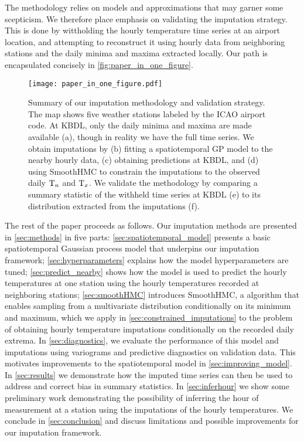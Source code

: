 The methodology relies on models and approximations that may garner some scepticism.
We therefore place emphasis on validating the imputation strategy.
This is done by wittholding the hourly temperature time series at an airport location,
and attempting to reconstruct it using hourly data from neighboring stations 
and the daily minima and maxima extracted locally.
Our path is encapsulated concisely in \autoref{fig:paper_in_one_figure}.

\begin{figure}[tb]
\centering
\texttt{[image: paper\_in\_one\_figure.pdf]}
\caption{\label{fig:paper_in_one_figure}
Summary of our imputation methodology and validation strategy.
The map shows five weather stations labeled by the ICAO airport code.
At KBDL, only the daily minima and maxima are made available (a), though in reality
we have the full time series.
We obtain imputations by (b) fitting a spatiotemporal GP model to the nearby hourly data,
(c) obtaining predictions at KBDL, and (d) using SmoothHMC to constrain the imputations to the observed daily $\mathrm{T}_{n}$ and $\mathrm{T}_{x}$.
We validate the methodology by comparing a summary statistic of the withheld time series at KBDL (e) to
its distribution extracted from the imputations (f).
}
\end{figure}

The rest of the paper proceeds as follows.
Our imputation methods are presented in \autoref{sec:methods} in five parts:
\autoref{sec:spatiotemporal_model} presents a basic spatiotemporal Gaussian process model 
that underpins our imputation framework;
\autoref{sec:hyperparameters} explains how the model hyperparameters are tuned;
\autoref{sec:predict_nearby} shows how the model is used to predict the hourly temperatures 
at one station using the hourly temperatures recorded at neighboring stations;
\autoref{sec:smoothHMC} introduces SmoothHMC, a algorithm that enables
sampling from a multivariate distribution conditionally on its minimum and maximum,
which we apply in \autoref{sec:constrained_imputations} to the problem
of obtaining hourly temperature imputations conditionally on the recorded daily extrema.
In \autoref{sec:diagnostics}, we evaluate the performance of this model and imputations
using variograms and predictive diagnostics on validation data.
This motivates improvements to the spatiotemporal model in \autoref{sec:improving_model}.
In \autoref{sec:results} we demonstrate how the imputed time series can then be used 
to address and correct bias in summary statistics.
In \autoref{sec:inferhour} we show some preliminary work demonstrating the possibility of inferring the hour of measurement
at a station using the imputations of the hourly temperatures.
We conclude in \autoref{sec:conclusion} and discuss limitations and possible improvements for 
our imputation framework.

